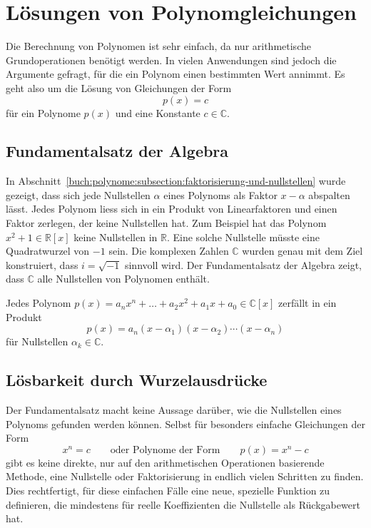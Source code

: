 %
%
%
\section{Lösungen von Polynomgleichungen
\label{buch:potenzen:section:loesungen}}
Die Berechnung von Polynomen ist sehr einfach, da nur arithmetische 
Grundoperationen benötigt werden.
In vielen Anwendungen sind jedoch die Argumente gefragt, für die ein
Polynom einen bestimmten Wert annimmt.
Es geht also um die Lösung von Gleichungen der Form
\[
p(x) = c
\]
für ein Polynome $p(x)$ und eine Konstante $c\in\mathbb{C}$.

%
%
\subsection{Fundamentalsatz der Algebra}
In Abschnitt~\ref{buch:polynome:subsection:faktorisierung-und-nullstellen}
wurde gezeigt, dass sich jede Nullstellen $\alpha$ eines Polynoms als
Faktor $x-\alpha$ abspalten lässt.
Jedes Polynom liess sich in ein Produkt von Linearfaktoren und
einen Faktor zerlegen, der keine Nullstellen hat.
Zum Beispiel hat das Polynom $x^2+1\in\mathbb{R}[x]$ keine
Nullstellen in $\mathbb{R}$.
Eine solche Nullstelle müsste eine Quadratwurzel von $-1$ sein.
Die komplexen Zahlen $\mathbb{C}$ wurden genau mit dem Ziel konstruiert,
dass $i=\sqrt{-1}$ sinnvoll wird.
Der Fundamentalsatz der Algebra zeigt, dass $\mathbb{C}$ alle
Nullstellen von Polynomen enthält.

\begin{satz}[Gauss]
%
\label{buch:potenzen:satz:fundamentalsatz}
Jedes Polynom $p(x)=a_nx^n+\dots + a_2x^2 + a_1x + a_0\in\mathbb{C}[x]$
zerfällt in ein Produkt
\[
p(x)
=
a_n
(x-\alpha_1)(x-\alpha_2)\cdots(x-\alpha_n)
\]
für Nullstellen $\alpha_k\in\mathbb{C}$.
\end{satz}


%
%
\subsection{Lösbarkeit durch Wurzelausdrücke}
Der Fundamentalsatz macht keine Aussage darüber, wie die Nullstellen
eines Polynoms gefunden werden können.
Selbst für besonders einfache Gleichungen der Form
\[
x^n = c
\qquad
\text{oder Polynome der Form}
\qquad
p(x) = x^n -c
\]
gibt es keine direkte, nur auf den arithmetischen
Operationen basierende Methode, eine Nullstelle oder Faktorisierung
in endlich vielen Schritten zu finden.
Dies rechtfertigt, für diese einfachen Fälle eine neue, spezielle
Funktion zu definieren, die mindestens für reelle Koeffizienten 
die Nullstelle als Rückgabewert hat.

